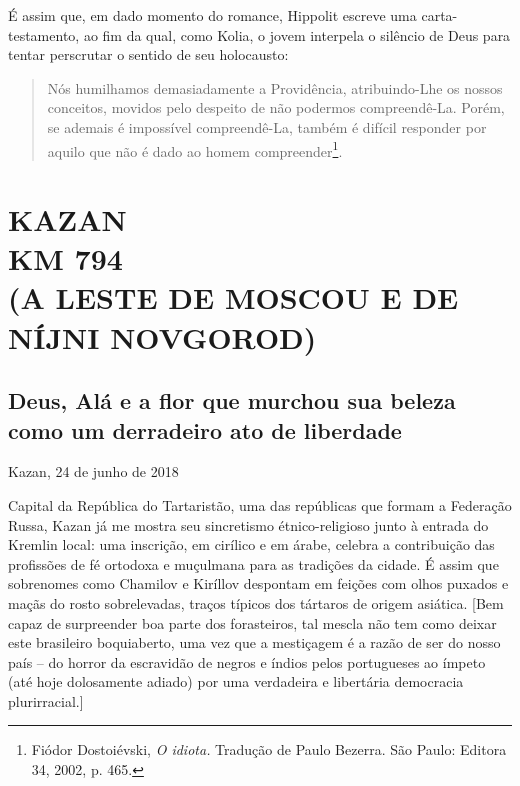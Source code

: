 É assim que, em dado momento do romance, Hippolit escreve uma
carta-testamento, ao fim da qual, como Kolia, o jovem interpela o
silêncio de Deus para tentar perscrutar o sentido de seu holocausto:

\begin{quote}
Nós humilhamos demasiadamente a Providência, atribuindo-Lhe os nossos
conceitos, movidos pelo despeito de não podermos compreendê-La. Porém,
se ademais é impossível compreendê-La, também é difícil responder por
aquilo que não é dado ao homem compreender\footnote{Fiódor Dostoiévski,
  \emph{O idiota.} Tradução de Paulo Bezerra. São Paulo: Editora 34,
  2002, p. 465.}.
\end{quote}


\movetooddpage
{}
\part*{KAZAN\\KM 794\\(A LESTE DE MOSCOU E DE NÍJNI NOVGOROD)}


\chapter*{Deus, Alá e a flor que murchou sua beleza como um derradeiro ato de liberdade}

\begin{flushright}
Kazan, 24 de junho de 2018
\end{flushright}

Capital da República do Tartaristão, uma das repúblicas que formam a
Federação Russa, Kazan já me mostra seu sincretismo étnico-religioso
junto à entrada do Kremlin local: uma inscrição, em cirílico e em árabe,
celebra a contribuição das profissões de fé ortodoxa e muçulmana para as
tradições da cidade. É assim que sobrenomes como Chamilov e Kiríllov
despontam em feições com olhos puxados e maçãs do rosto sobrelevadas,
traços típicos dos tártaros de origem asiática. {[}Bem capaz de
surpreender boa parte dos forasteiros, tal mescla não tem como deixar
este brasileiro boquiaberto, uma vez que a mestiçagem é a razão de ser
do nosso país -- do horror da escravidão de negros e índios pelos
portugueses ao ímpeto (até hoje dolosamente adiado) por uma verdadeira e
libertária democracia plurirracial.{]}

